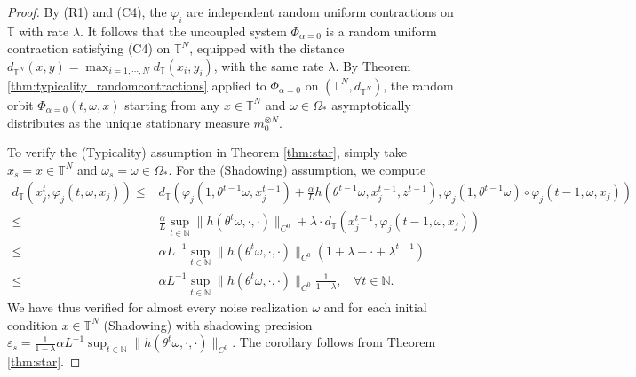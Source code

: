 \documentclass[10pt,a4paper]{amsart}
\newcommand{\N}{\mathbb{N}}
\newcommand{\T}{\mathbb{T}}
\begin{document}
\begin{proof}
By (R1) and (C4), the $\varphi_i$ are independent random uniform contractions on $\T$ with rate $\lambda$. It follows that  the uncoupled system $\Phi_{\alpha=0}$ is a random uniform contraction satisfying (C4) on $\T^{N}$, equipped with the distance $d_{\T^{N}}(x,y)= \max_{i=1,\cdots,N} d_{\T}(x_i,y_i)$, with the same rate $\lambda$. By Theorem \ref{thm:typicality_randomcontractions} applied to $\Phi_{\alpha=0}$ on $(\T^{N},d_{\T^{N}})$, the random orbit $\Phi_{\alpha=0}(t,\omega,x)$ starting from any $x\in\T^N$ and $\omega\in\Omega_*$ asymptotically distributes as the unique stationary measure $m_0^{\otimes N}$. 


To verify the (Typicality) assumption in Theorem \ref{thm:star}, simply take $x_s=x\in\T^N$ and $\omega_s=\omega\in\Omega_*$.
	For the (Shadowing) assumption, we compute
	\begin{align*}
		d_{\T}(x_j^t, \varphi_j(t,\omega,x_j)) \leq & d_{\T}\left(\varphi_j(1,\theta^{t-1}\omega,x_j^{t-1}) + \frac{\alpha}{L}  h(\theta^{t-1}\omega,x_j^{t-1},z^{t-1}), \varphi_j(1,\theta^{t-1}\omega)\circ \varphi_j(t-1,\omega,x_j)\right)\\
		\leq & \frac{\alpha}{L} \sup_{t\in\N} \|h(\theta^t\omega,\cdot,\cdot)\|_{C^0}+ \lambda\cdot d_{\T}(x_j^{t-1}, \varphi_j(t-1,\omega,x_j))\\
		\leq& \alpha  L^{-1} \sup_{t\in\N} \|h(\theta^t\omega,\cdot,\cdot)\|_{C^0}(1+\lambda + \cdot + \lambda^{t-1}) \\
		\leq & \alpha  L^{-1} \sup_{t\in\N} \|h(\theta^t\omega,\cdot,\cdot)\|_{C^0} \frac{1}{1-\lambda},~~~~\forall t\in\N.
	\end{align*}
	We have thus verified for almost every noise realization $\omega$ and for each initial condition $x\in\T^N$ (Shadowing) with %
	shadowing precision $\varepsilon_s =  \frac{1}{1-\lambda} \alpha L^{-1} \sup_{t\in\N} \|h(\theta^t\omega,\cdot,\cdot)\|_{C^0}$. 
	The corollary follows from Theorem \ref{thm:star}.
\end{proof}
\end{document}
